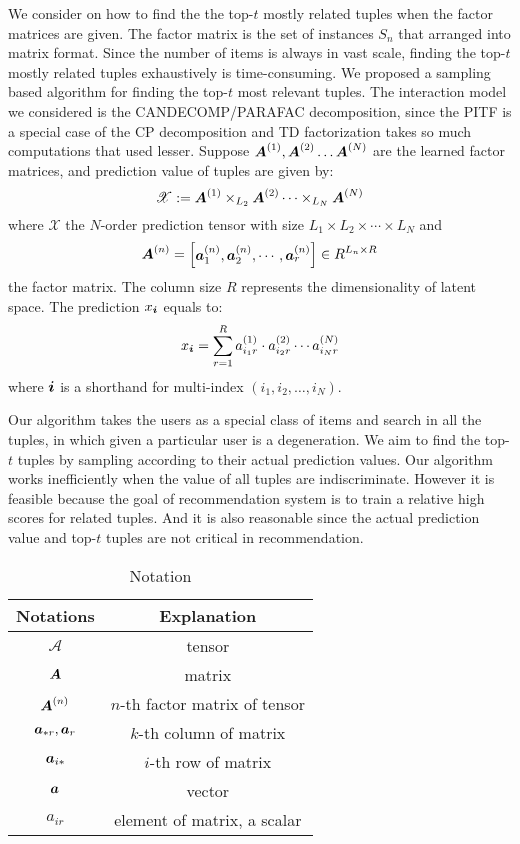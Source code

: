 \documentclass[letterpaper]{article}
\newcommand{\Sca}[3]{{#1}^{(#2)}_{i_#2#3}}%
\newcommand{\anr}[2]{\Sca{a}{#1}{#2}}
\newcommand{\T}[1]{\boldsymbol{\mathscr{{#1}}}}
\newcommand{\V}[1]{{\bm{{\MakeLowercase{#1}}}}}
\newcommand{\VnC}[3]{\V{#1}^{(#2)}_{#3}}
\newcommand{\M}[1]{{\bm{{\MakeUppercase{#1}}}}}
\newcommand{\Mn}[2]{\M{#1}^{(#2)}}
\newcommand{\coord}{(i_1,i_2,\ldots,i_N)}
\begin{document}
We consider on how to find the the top-$t$ mostly related tuples when the factor matrices are given.
The factor matrix is the set of instances $S_n$ that arranged into matrix format.
Since the number of items is always in vast scale,
finding the top-$t$ mostly related tuples exhaustively is time-consuming.
We proposed a sampling based algorithm for finding the top-$t$ most relevant tuples.
The interaction model we considered is the CANDECOMP/PARAFAC decomposition\cite{KoBa09},
since the PITF is a special case of the CP decomposition
and TD factorization takes so much computations that used lesser.
Suppose $\Mn{A}{1},\Mn{A}{2}\ldots\Mn{A}{N}$ are the learned factor matrices,
and prediction value of tuples are given by:
\begin{equation}\label{eq:CPDecomposition}
    \T{X} := \Mn{A}{1}\times_{L_2}\Mn{A}{2}\cdots\times_{L_N}\Mn{A}{N}
\end{equation}
where $\T{X}$ the $N$-order prediction tensor with size
$L_1\times L_2\times\cdots\times L_N$ and
\[
\M{A}^{(n)} =
\begin{bmatrix}
    \VnC{a}{n}{1},\VnC{a}{n}{2},\cdots,\VnC{a}{n}{r}
\end{bmatrix}  \in R^{L_n\times R}
\]
the factor matrix. The column size $R$ represents the dimensionality of latent space.
The prediction $x_\V{i}$ equals to:
\begin{equation}\label{eq:ValueInTensor}
    x_\V{i} = \sum_{r=1}^{R}\anr{1}{r}\cdot\anr{2}{r}\cdots\anr{N}{r}
\end{equation}
where $\V{i}$ is a shorthand for multi-index $\coord$.

Our algorithm takes the users as a special class of items and search in all the tuples,
in which given a particular user is a degeneration.
We aim to find the top-$t$ tuples by sampling according to their actual prediction values.
Our algorithm works inefficiently when the value of all tuples are indiscriminate.
However it is feasible because the goal of recommendation system is to train a relative
high scores for related tuples.
And it is also reasonable since the actual prediction value and
top-$t$ tuples are not critical in recommendation.

\begin{table}[t]
  \centering
  \begin{tabular}{|c|c|}
    \hline
    Notations & Explanation \\
    \hline
    $\T{A}$ & tensor \\
    $\M{A}$ & matrix \\
    $\Mn{A}{n}$ & $n$-th factor matrix of tensor\\
    $\V{A}_{*r},\V{A}_r$ & $k$-th column of matrix \\
    $\V{A}_{i*}$ & $i$-th row of matrix \\
    $\V{A}$ & vector \\
    $a_{ir}$ & element of matrix, a scalar\\
    \hline
  \end{tabular}
  \caption{Notation}
  \label{table:Notation}
\end{table}
\end{document}
